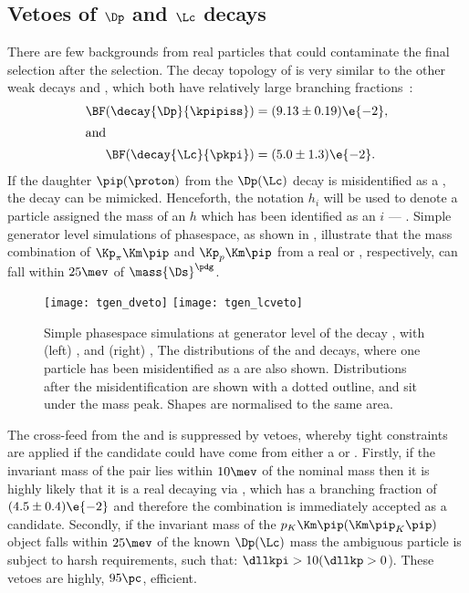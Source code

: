 \subsection[Vetoes of {\Dp} and {\Lc} deacys]
{Vetoes of $\boldsymbol{\Dp}$ and $\boldsymbol{\Lc}$ decays}
\label{sec:dsphi:sel:veto}
There are few backgrounds from real particles that could contaminate the final selection after the
\bdt selection.
The decay topology of \dstokkpi is very similar to the other weak decays \decay{\Dp}{\kpipiss} and
\decay{\Lc}{\pkpi}, which both
have relatively large branching fractions~\cite{PDG2012}:
\begin{align}
  \BF(\decay{\Dp}{\kpipiss}) &= (9.13\pm0.19)\e{-2}, \nonumber\\
  \intertext{and}
  \BF(\decay{\Lc}{\pkpi}) &= (5.0\pm1.3)\e{-2}.\nonumber
\end{align}
If the daughter $\pip(\proton)$ from the $\Dp(\Lc)$ decay is misidentified as a \Kp, the decay
\dstokkpi can be mimicked.
Henceforth, the notation $h_i$ will be used to denote a particle assigned the mass of an $h$ which
has been identified as an $i$ --- .
Simple generator level simulations of phasespace, as shown in , illustrate that
the mass combination of $\Kp_\pi\Km\pip$ and $\Kp_p\Km\pip$ from a real \Dp or \Lc, respectively,
can fall within $25\mev$ of $\mass{\Ds}^\pdg$.


\begin{figure}
  \begin{center}
    \texttt{[image: tgen\_dveto]}
    \texttt{[image: tgen\_lcveto]}
    \caption[Vetoing \Ds contamination from \Lc and \Dp decays]
    {
      Simple phasespace simulations at generator level of the decay \decay{\Ds}{\kkpi}, with
      (left) \decay{\Dp}{\kpipiss}, and
      (right) \decay{\Lc}{\pkpi},
      The distributions of the \Dp and \Lc decays, where one particle has been misidentified as a
      \Kp are also shown.
      Distributions after the misidentification are shown with a dotted outline, and sit under the
      \Ds mass peak.
      Shapes are normalised to the same area.
    }
    \label{fig:dsphi:veto}
  \end{center}
\end{figure}

The cross-feed from the \Dp and \Lc is suppressed by vetoes, whereby tight \pid constraints are
applied if the \dstokkpi candidate could have come from either a \Dp or \Lc.
Firstly, if the invariant mass of the \kk pair lies within $10\mev$ of the nominal \phii mass
then it is highly likely that it is a real \Ds decaying via \decay{\Ds}{\phi\pip}, which has a
branching fraction of $(4.5\pm0.4)\e{-2}$ and therefore the \kkpi combination is immediately
accepted as a \Ds candidate.
Secondly, if the invariant mass of the $p_K\Km\pip(\Km\pip_K\pip)$ object falls within $25\mev$ of
the known $\Dp(\Lc)$ mass the ambiguous particle is subject to harsh \pid requirements, such that:
$\dllkpi>10(\dllkp>0$).
These vetoes are highly, \approx$95\pc$, efficient.



